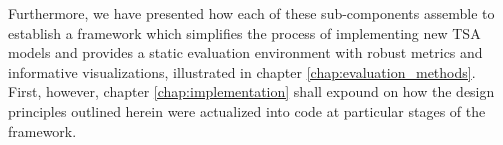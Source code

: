 \documentclass[../../fyp.tex]{subfiles}
\begin{document}
Furthermore, we have presented how each of these sub-components assemble to establish a framework which simplifies the process of implementing new TSA models and provides a static evaluation environment with robust metrics and informative visualizations, illustrated in chapter \ref{chap:evaluation_methods}. First, however, chapter \ref{chap:implementation} shall expound on how the design principles outlined herein were actualized into code at particular stages of the framework.
\end{document}
